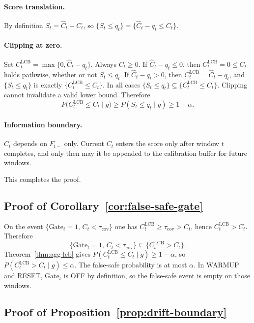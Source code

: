 \paragraph{Score translation.}
By definition $S_t=\widehat C_t-C_t$, so
$\{S_t\le q_t\}=\{\widehat C_t-q_t\le C_t\}$.

\paragraph{Clipping at zero.}
Set $C^{\mathrm{LCB}}_t=\max\{0,\widehat C_t-q_t\}$.  Always $C_t\ge 0$.
If $\widehat C_t-q_t\le 0$, then $C^{\mathrm{LCB}}_t=0\le C_t$ holds pathwise,
whether or not $S_t\le q_t$.  If $\widehat C_t-q_t>0$, then
$C^{\mathrm{LCB}}_t=\widehat C_t-q_t$, and $\{S_t\le q_t\}$ is exactly
$\{C^{\mathrm{LCB}}_t\le C_t\}$.  In all cases
$\{S_t\le q_t\}\subseteq\{C^{\mathrm{LCB}}_t\le C_t\}$.  Clipping cannot
invalidate a valid lower bound.  Therefore
\[
 P\bigl(C^{\mathrm{LCB}}_t\le C_t\mid g\bigr)
 \ge
 P(S_t\le q_t\mid g)
 \ge 1-\alpha.
\]

\paragraph{Information boundary.}
$\widehat C_t$ depends on $F_{t-}$ only.  Current $C_t$ enters the score only
after window $t$ completes, and only then may it be appended to the
calibration buffer for future windows.

This completes the proof.

\subsection{Proof of Corollary~\ref{cor:false-safe-gate}}
\label{app:proof_false_safe}

On the event $\{\mathrm{Gate}_t=1,\,C_t<\tau_{\mathrm{cov}}\}$ one has
$C^{\mathrm{LCB}}_t\ge\tau_{\mathrm{cov}}>C_t$, hence
$C^{\mathrm{LCB}}_t>C_t$.  Therefore
\[
 \{\mathrm{Gate}_t=1,\,C_t<\tau_{\mathrm{cov}}\}
 \subseteq
 \{C^{\mathrm{LCB}}_t>C_t\}.
\]
Theorem~\ref{thm:agg-lcb} gives $P(C^{\mathrm{LCB}}_t\le C_t\mid g)\ge 1-\alpha$,
so $P(C^{\mathrm{LCB}}_t>C_t\mid g)\le\alpha$.  The false-safe probability is
at most $\alpha$.  In WARMUP and RESET, $\mathrm{Gate}_t$ is OFF by definition,
so the false-safe event is empty on those windows.

\subsection{Proof of Proposition~\ref{prop:drift-boundary}}
\label{app:proof_drift_boundary}

